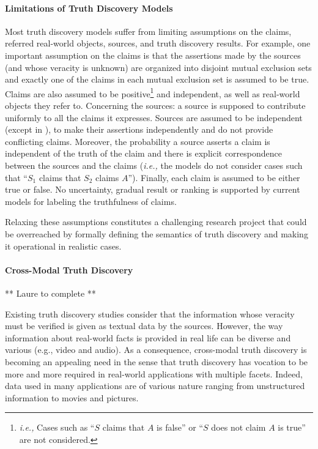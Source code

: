 \documentclass[prodmode,acmtecs]{acmsmall} %
\begin{document}
\paragraph{Limitations of Truth Discovery Models} 

Most truth discovery models suffer from limiting assumptions on the claims, referred real-world objects, sources, and truth 
discovery results. For example, one important assumption on the claims is that the assertions made by the sources (and whose 
veracity is unknown) are organized into disjoint mutual exclusion sets and exactly one of the claims in each mutual exclusion 
set is assumed to be true. Claims are also assumed to be positive\footnote{\scriptsize{{\it i.e.,}  Cases such  as ``$S$ claims 
that $A$ is false'' or ``$S$ does not claim $A$ is true'' are not considered.}} and  independent, as well as real-world objects 
they refer to. Concerning the sources: a source is supposed to contribute uniformly to all the claims it expresses. Sources are 
assumed to be independent (except in \cite{DongBHS10a}), to make their assertions independently and do not provide conflicting claims.
Moreover, the probability a source asserts a claim is independent of the truth of the claim and there is explicit correspondence 
between the sources and the claims ({\it i.e.,} the models do not consider cases such that ``$S_1$ claims that $S_2$ claims $A$''). Finally,
each claim is assumed to be either true or false. No uncertainty, gradual result or ranking is supported by current models for labeling the 
truthfulness of claims. 

Relaxing these assumptions constitutes a challenging research project that could be overreached by formally defining the semantics of truth 
discovery and making it operational in realistic cases. 

\paragraph*{Cross-Modal Truth Discovery} 
** Laure to complete **

Existing truth discovery studies consider that the information whose veracity must be verified is given 
as textual data by the sources. However, the way information about real-world facts is provided in real 
life can be diverse and various (e.g., video and audio). As a consequence, cross-modal truth discovery 
is becoming an appealing need in the sense that truth discovery has vocation to be more and more required
in real-world applications with multiple facets.
Indeed, data used in many applications are of various nature ranging from unstructured information to movies
and pictures.
\end{document}
